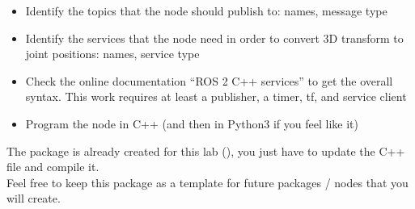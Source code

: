 \documentclass{ecnreport}
\begin{document}
\begin{itemize}
\item Identify the topics that the node should publish to: names, message type
\item Identify the services that the node need in order to convert 3D transform to joint positions: names, service type
\item Check the online documentation ``ROS 2 C++ services'' to get the overall syntax. This work requires at least a publisher, a timer, tf, and service client
\item Program the node in C++ (and then in Python3 if you feel like it)
\end{itemize}

The package is already created for this lab (), you just have to update the C++ file and compile it.\\
Feel free to keep this package as a template for future packages / nodes that you will create.
\end{document}
